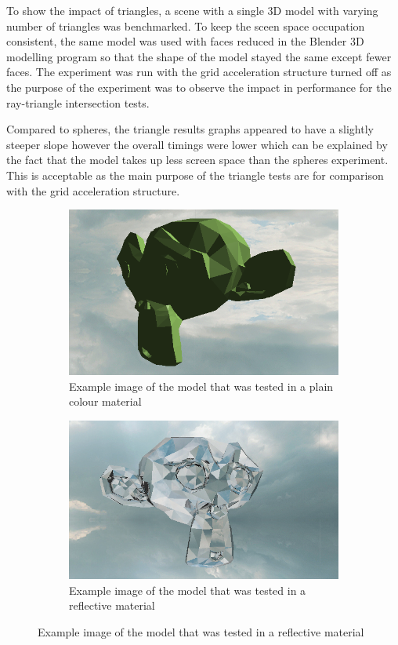 \documentclass[final]{cmpreport}
\begin{document}
To show the impact of triangles, a scene with a single 3D model with varying number of triangles was benchmarked. To keep the sceen space occupation consistent, the same model was used with faces reduced in the Blender 3D modelling program so that the shape of the model stayed the same except fewer faces. The experiment was run with the grid acceleration structure turned off as the purpose of the experiment was to observe the impact in performance for the ray-triangle intersection tests.

Compared to spheres, the triangle results graphs appeared to have a slightly steeper slope however the overall timings were lower which can be explained by the fact that the model takes up less screen space than the spheres experiment. This is acceptable as the main purpose of the triangle tests are for comparison with the grid acceleration structure.

\begin{figure}
    \centering
    \begin{subfigure}{0.5\textwidth}
        \centering
        \includegraphics[width=0.9\linewidth]{img/model_diffuse.png}
        \caption{Example image of the model that was tested in a plain colour material}
        \label{egimgmodeldiffuse}
    \end{subfigure}%
    \begin{subfigure}{0.5\textwidth}
        \centering
        \includegraphics[width=0.9\linewidth]{img/model_reflect.png}
        \caption{Example image of the model that was tested in a reflective material}
        \label{egimgmodelreflect}
    \end{subfigure}
\end{figure}
\end{document}
